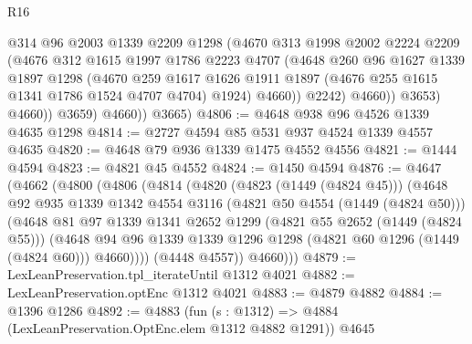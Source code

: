 \begin{lexlean}{R16}
\begin{coremodule}
                      @314
                      @96
                      @2003
                      @1339
                      @2209
                      @1298
                      (@4670
                        @313
                        @1998
                        @2002
                        @2224
                        @2209
                        (@4676
                          @312
                          @1615
                          @1997
                          @1786
                          @2223
                          @4707
                          (@4648
                            @260
                            @96
                            @1627
                            @1339
                            @1897
                            @1298
                            (@4670
                              @259
                              @1617
                              @1626
                              @1911
                              @1897
                              (@4676 @255 @1615 @1341 @1786 @1524 @4707 @4704)
                              @1924)
                            @4660))
                        @2242)
                      @4660))
                  @3653)
                @4660))
            @3659)
          @4660))
      @3665)
@4806 := @4648 @938 @96 @4526 @1339 @4635 @1298
@4814 := @2727 @4594 @85 @531 @937 @4524 @1339 @4557 @4635
@4820 := @4648 @79 @936 @1339 @1475 @4552 @4556
@4821 := @1444 @4594
@4823 := @4821 @45 @4552
@4824 := @1450 @4594
@4876 := @4647
    (@4662
      (@4800
        (@4806
          (@4814
            (@4820
              (@4823 (@1449 (@4824 @45)))
              (@4648
                @92
                @935
                @1339
                @1342
                @4554
                @3116
                (@4821 @50 @4554 (@1449 (@4824 @50)))
                (@4648
                  @81
                  @97
                  @1339
                  @1341
                  @2652
                  @1299
                  (@4821 @55 @2652 (@1449 (@4824 @55)))
                  (@4648
                    @94
                    @96
                    @1339
                    @1339
                    @1296
                    @1298
                    (@4821 @60 @1296 (@1449 (@4824 @60)))
                    @4660))))
            (@4448 @4557))
          @4660)))
@4879 := LexLeanPreservation.tpl_iterateUntil @1312 @4021
@4882 := LexLeanPreservation.optEnc @1312 @4021
@4883 := @4879 @4882
@4884 := @1396 @1286
@4892 := @4883 (fun (s : @1312) => @4884 (LexLeanPreservation.OptEnc.elem @1312 @4882 @1291)) @4645

\end{coremodule}
\end{lexlean}
